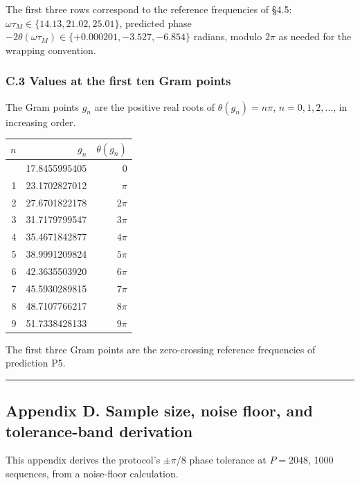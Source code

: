 \documentclass[
  letterpaper,
  11pt]{article}
\newcounter{none} %
\theoremstyle{plain}
\theoremstyle{definition}
\theoremstyle{remark}
\begin{document}
The first three rows correspond to the reference frequencies of §4.5: \(\omega\tau_M \in \{14.13, 21.02, 25.01\}\), predicted phase \(-2\theta(\omega\tau_M) \in \{+0.000201, -3.527, -6.854\}\) radians, modulo \(2\pi\) as needed for the wrapping convention.

\subsubsection{C.3 Values at the first ten Gram points}\label{c.3-values-at-the-first-ten-gram-points}

The Gram points \(g_n\) are the positive real roots of \(\theta(g_n) = n\pi\), \(n = 0, 1, 2, \ldots\), in increasing order.

{\def\LTcaptype{none} %
\begin{longtable}[]{@{}rrr@{}}
\toprule\noalign{}
\(n\) & \(g_n\) & \(\theta(g_n)\) \\
\midrule\noalign{}
\endhead
\bottomrule\noalign{}
\endlastfoot
0 & 17.8455995405 & \(0\) \\
1 & 23.1702827012 & \(\pi\) \\
2 & 27.6701822178 & \(2\pi\) \\
3 & 31.7179799547 & \(3\pi\) \\
4 & 35.4671842877 & \(4\pi\) \\
5 & 38.9991209824 & \(5\pi\) \\
6 & 42.3635503920 & \(6\pi\) \\
7 & 45.5930289815 & \(7\pi\) \\
8 & 48.7107766217 & \(8\pi\) \\
9 & 51.7338428133 & \(9\pi\) \\
\end{longtable}
}

The first three Gram points are the zero-crossing reference frequencies of prediction P5.

\begin{center}\rule{0.5\linewidth}{0.5pt}\end{center}

\subsection{Appendix D. Sample size, noise floor, and tolerance-band derivation}\label{appendix-d.-sample-size-noise-floor-and-tolerance-band-derivation}

This appendix derives the protocol's \(\pm \pi/8\) phase tolerance at \(P = 2048\), 1000 sequences, from a noise-floor calculation.
\end{document}
